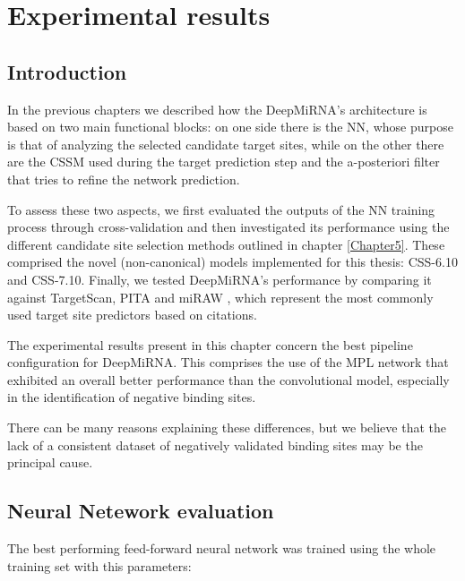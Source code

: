 
\chapter{Experimental results} %

\label{Chapter6} %

\section{Introduction}
In the previous chapters we described how the DeepMiRNA's architecture is based on two main functional blocks: on one side there is the NN, whose purpose is that of analyzing the selected candidate target sites, while on the other there are the CSSM used during the target prediction step and the a-posteriori filter that tries to refine the network prediction. 

To assess these two aspects, we first evaluated the outputs of the NN training process through cross-validation and then investigated its performance using the different candidate site selection methods outlined in chapter \ref{Chapter5}. These comprised the novel (non-canonical) models implemented for this thesis: CSS-6.10 and CSS-7.10. Finally, we tested DeepMiRNA’s performance by comparing it against TargetScan\cite{targetscan}, PITA\cite{accessibility_nrg_role} and miRAW \cite{miraw}, which represent the most commonly used target site predictors based on citations.

The experimental results present in this chapter concern the best pipeline configuration for DeepMiRNA. This comprises the use of the MPL network that exhibited an overall better performance than the convolutional model, especially in the identification of negative binding sites. 

There can be many reasons explaining these differences, but we believe that the lack of a consistent dataset of negatively validated binding sites may be the principal cause. 

\section{Neural Netework evaluation}
The best performing feed-forward neural network was trained using the whole training set with this parameters:

